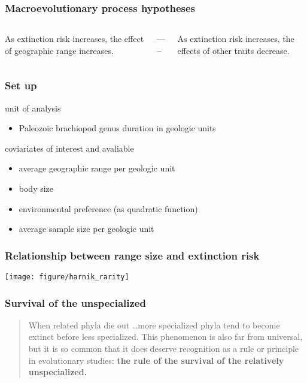 \documentclass{beamer}
\begin{document}
\begin{frame}
  \frametitle{Macroevolutionary process hypotheses}
  \begin{center}
    \begin{columns}
      \begin{column}{0.45\textwidth}
        As extinction risk increases, the effect of geographic range increases.
      \end{column}
      \begin{column}{0.05\textwidth}
        \textbf{-----}
      \end{column}
      \begin{column}{0.45\textwidth}
        As extinction risk increases, the effects of other traits decrease.
      \end{column}
    \end{columns}
  \end{center}
\end{frame}

\begin{frame}
  \frametitle{Set up}

  unit of analysis
  \begin{itemize}
    \item Paleozoic brachiopod genus duration in geologic units
  \end{itemize}

  coviariates of interest and avaliable
  \begin{itemize}
    \item average geographic range per geologic unit
    \item body size
    \item environmental preference (as quadratic function)
    \item average sample size per geologic unit 
  \end{itemize}
\end{frame}

\begin{frame}
  \frametitle{Relationship between range size and extinction risk}
  \begin{center}
    \texttt{[image: figure/harnik\_rarity]}
  \end{center}

\end{frame}

\begin{frame}
  \frametitle{Survival of the unspecialized}
  \begin{quote}
    When related phyla die out \dots more specialized phyla tend to become extinct before less specialized. This phenomenon is also far from universal, but it is so common that it does deserve recognition as a rule or principle in evolutionary studies: \textbf{the rule of the survival of the relatively unspecialized.}

  \end{quote}
\end{frame}
\end{document}
